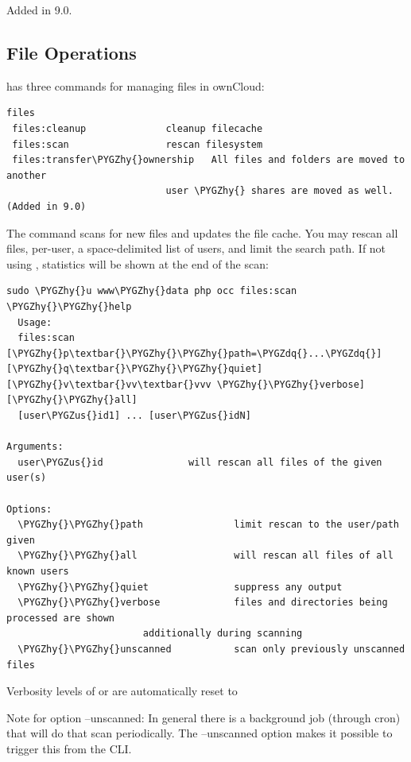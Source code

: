 \documentclass[letterpaper,10pt,english]{sphinxmanual}
\def\PYGZus{\char`\_}
\def\PYGZhy{\char`\-}
\def\PYGZdq{\char`\"}
\begin{document}
Added in 9.0.


\subsection{File Operations}
\label{configuration_server/occ_command:file-operations-label}\label{configuration_server/occ_command:file-operations}
 has three commands for managing files in ownCloud:

\begin{Verbatim}[commandchars=\\\{\}]
files
 files:cleanup              cleanup filecache
 files:scan                 rescan filesystem
 files:transfer\PYGZhy{}ownership   All files and folders are moved to another
                            user \PYGZhy{} shares are moved as well. (Added in 9.0)
\end{Verbatim}

The  command scans for new files and updates the file cache. You
may rescan all files, per-user, a space-delimited list of users, and limit the
search path. If not using , statistics will be shown at the end of
the scan:

\begin{Verbatim}[commandchars=\\\{\}]
sudo \PYGZhy{}u www\PYGZhy{}data php occ files:scan \PYGZhy{}\PYGZhy{}help
  Usage:
  files:scan [\PYGZhy{}p\textbar{}\PYGZhy{}\PYGZhy{}path=\PYGZdq{}...\PYGZdq{}] [\PYGZhy{}q\textbar{}\PYGZhy{}\PYGZhy{}quiet] [\PYGZhy{}v\textbar{}vv\textbar{}vvv \PYGZhy{}\PYGZhy{}verbose] [\PYGZhy{}\PYGZhy{}all]
  [user\PYGZus{}id1] ... [user\PYGZus{}idN]

Arguments:
  user\PYGZus{}id               will rescan all files of the given user(s)

Options:
  \PYGZhy{}\PYGZhy{}path                limit rescan to the user/path given
  \PYGZhy{}\PYGZhy{}all                 will rescan all files of all known users
  \PYGZhy{}\PYGZhy{}quiet               suppress any output
  \PYGZhy{}\PYGZhy{}verbose             files and directories being processed are shown
                        additionally during scanning
  \PYGZhy{}\PYGZhy{}unscanned           scan only previously unscanned files
\end{Verbatim}

Verbosity levels of  or  are automatically reset to 

Note for option --unscanned:
In general there is a background job (through cron) that will do that scan periodically.
The --unscanned option makes it possible to trigger this from the CLI.
\end{document}
